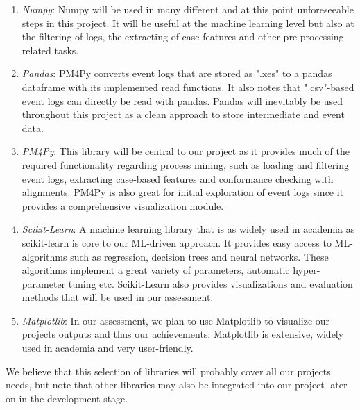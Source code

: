 \documentclass[12pt,a4paper]{article}
\begin{document}
\begin{enumerate}
	\item \textit{Numpy}: Numpy will be used in many different and at this point unforeseeable steps in this project. It will be useful at the machine learning level but also at the filtering of logs, the extracting of case features and other pre-processing related tasks. 
	\item \textit{Pandas}: PM4Py converts event logs that are stored as ".xes" to a pandas dataframe with its implemented read functions. It also notes that ".csv"-based event logs can directly be read with pandas. Pandas will inevitably be used throughout this project as a clean approach to store intermediate and event data.
	\item \textit{PM4Py}: This library will be central to our project as it provides much of the required functionality regarding process mining, such as loading and filtering event logs, extracting case-based features and conformance checking with alignments. PM4Py is also great for initial exploration of event logs since it provides a comprehensive visualization module.
	\item \textit{Scikit-Learn}: A machine learning library that is as widely used in academia as scikit-learn is core to our ML-driven approach. It provides easy access to ML-algorithms such as regression, decision trees and neural networks. These algorithms implement a great variety of parameters, automatic hyper-parameter tuning etc. Scikit-Learn also provides visualizations and evaluation methods that will be used in our assessment. 
	\item \textit{Matplotlib}: In our assessment, we plan to use Matplotlib to visualize our projects outputs and thus our achievements. Matplotlib is extensive, widely used in academia and very user-friendly.
\end{enumerate}
We believe that this selection of libraries will probably cover all our projects needs, but note that other libraries may also be integrated into our project later on in the development stage.
\end{document}
